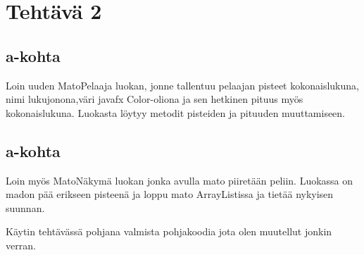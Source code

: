 
\chapter{Tehtävä 2 \label{chap:Teht=0000E4v=0000E4-2}}

\section{a-kohta}
\label{a-kohta}
Loin uuden MatoPelaaja luokan, jonne tallentuu pelaajan pisteet kokonaislukuna,
nimi lukujonona,väri javafx Color-oliona ja sen hetkinen pituus myös
kokonaislukuna. Luokasta löytyy metodit pisteiden ja pituuden muuttamiseen.
\section{a-kohta}
\label{a-kohta}
Loin myös MatoNäkymä luokan jonka avulla mato piiretään peliin. Luokassa on madon
pää erikseen pisteenä ja loppu mato ArrayListissa ja tietää nykyisen suunnan.

Käytin tehtävässä pohjana valmista pohjakoodia jota olen muutellut jonkin verran.

